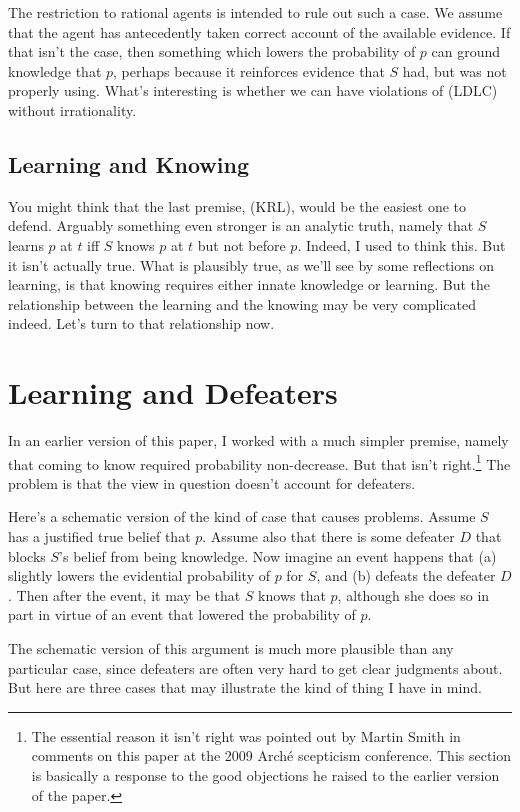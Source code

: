 The restriction to rational agents is intended to rule out such a case. We assume that the agent has antecedently taken correct account of the available evidence. If that isn't the case, then something which lowers the probability of $p$ can ground knowledge that $p$, perhaps because it reinforces evidence that $S$ had, but was not properly using. What's interesting is whether we can have violations of (LDLC) without irrationality.

\subsection{Learning and Knowing}

You might think that the last premise, (KRL), would be the easiest one to defend. Arguably something even stronger is an analytic truth, namely that $S$ learns $p$ at $t$ iff $S$ knows $p$ at $t$ but not before $p$. Indeed, I used to think this. But it isn't actually true. What is plausibly true, as we'll see by some reflections on learning, is that knowing requires either innate knowledge or learning. But the relationship between the learning and the knowing may be very complicated indeed. Let's turn to that relationship now.

\section{Learning and Defeaters}

In an earlier version of this paper, I worked with a much simpler premise, namely that coming to know required probability non-decrease. But that isn't right.\footnote{The essential reason it isn't right was pointed out by Martin Smith in comments on this paper at the 2009 Arch\'{e} scepticism conference. This section is basically a response to the good objections he raised to the earlier version of the paper.} The problem is that the view in question doesn't account for defeaters.

Here's a schematic version of the kind of case that causes problems. Assume $S$ has a justified true belief that $p$. Assume also that there is some defeater $D$ that blocks $S$'s belief from being knowledge. Now imagine an event happens that (a) slightly lowers the evidential probability of $p$ for $S$, and (b) defeats the defeater $D$. Then after the event, it may be that $S$ knows that $p$, although she does so in part in virtue of an event that lowered the probability of $p$.

The schematic version of this argument is much more plausible than any particular case, since defeaters are often very hard to get clear judgments about. But here are three cases that may illustrate the kind of thing I have in mind.

